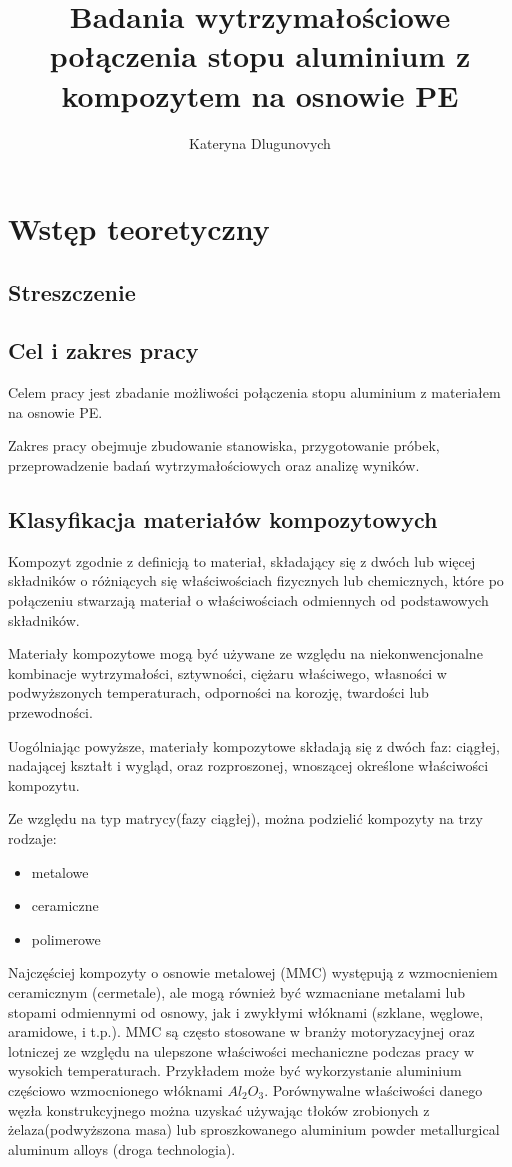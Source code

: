 \documentclass[magister,druk]{dyplom}
\author{Kateryna Dlugunovych}
\title{Badania wytrzymałościowe połączenia stopu aluminium z kompozytem na osnowie PE}
\begin{document}
	

\maketitle

\tableofcontents

\chapter{Wstęp teoretyczny}
\section{Streszczenie}
\section{Cel i zakres pracy}
Celem pracy jest zbadanie możliwości połączenia stopu aluminium z materiałem na osnowie PE.

Zakres pracy obejmuje zbudowanie stanowiska, przygotowanie próbek, przeprowadzenie badań wytrzymałościowych oraz analizę wyników.
\section{Klasyfikacja materiałów kompozytowych}

Kompozyt zgodnie z definicją to materiał, składający się z dwóch lub więcej składników o różniących się właściwościach fizycznych lub chemicznych, które po połączeniu stwarzają materiał o właściwościach odmiennych od podstawowych składników. 

Materiały kompozytowe mogą być używane ze względu na niekonwencjonalne kombinacje wytrzymałości, sztywności, ciężaru właściwego, własności w podwyższonych temperaturach, odporności na korozję, twardości lub przewodności.

Uogólniając powyższe, materiały kompozytowe składają się z dwóch faz: ciągłej, nadającej kształt i wygląd, oraz rozproszonej, wnoszącej określone właściwości kompozytu.

Ze względu na typ matrycy(fazy ciągłej), można podzielić kompozyty na trzy rodzaje:
\begin{itemize}	
\item metalowe
\item ceramiczne
\item polimerowe
\end{itemize}

Najczęściej kompozyty o osnowie metalowej (MMC) występują z wzmocnieniem ceramicznym (cermetale), ale mogą również być wzmacniane metalami lub stopami odmiennymi od osnowy, jak i zwykłymi włóknami (szklane, węglowe, aramidowe, i t.p.). MMC są często stosowane w branży motoryzacyjnej oraz lotniczej ze względu na ulepszone właściwości mechaniczne podczas pracy w wysokich temperaturach\cite{MMC}. Przykładem może być wykorzystanie aluminium częściowo wzmocnionego włóknami $Al_{2}O_{3}$. Porównywalne właściwości danego węzła konstrukcyjnego można uzyskać używając tłoków zrobionych z żelaza(podwyższona masa) lub sproszkowanego aluminium powder metallurgical aluminum alloys (droga technologia).
\end{document}
